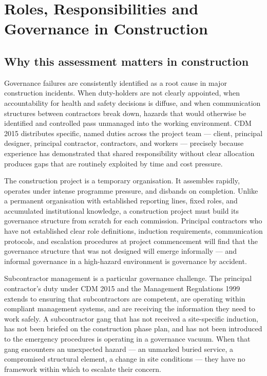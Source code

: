 \chapter{Roles, Responsibilities and Governance in Construction}
\label{chap:Roles, Responsibilities and Governance in Construction}

\section{Why this assessment matters in construction}

Governance failures are consistently identified as a root cause in major construction incidents. When duty-holders are not clearly appointed, when accountability for health and safety decisions is diffuse, and when communication structures between contractors break down, hazards that would otherwise be identified and controlled pass unmanaged into the working environment. CDM 2015 distributes specific, named duties across the project team --- client, principal designer, principal contractor, contractors, and workers --- precisely because experience has demonstrated that shared responsibility without clear allocation produces gaps that are routinely exploited by time and cost pressure.

The construction project is a temporary organisation. It assembles rapidly, operates under intense programme pressure, and disbands on completion. Unlike a permanent organisation with established reporting lines, fixed roles, and accumulated institutional knowledge, a construction project must build its governance structure from scratch for each commission. Principal contractors who have not established clear role definitions, induction requirements, communication protocols, and escalation procedures at project commencement will find that the governance structure that was not designed will emerge informally --- and informal governance in a high-hazard environment is governance by accident.

Subcontractor management is a particular governance challenge. The principal contractor's duty under CDM 2015 and the Management Regulations 1999 extends to ensuring that subcontractors are competent, are operating within compliant management systems, and are receiving the information they need to work safely. A subcontractor gang that has not received a site-specific induction, has not been briefed on the construction phase plan, and has not been introduced to the emergency procedures is operating in a governance vacuum. When that gang encounters an unexpected hazard --- an unmarked buried service, a compromised structural element, a change in site conditions --- they have no framework within which to escalate their concern.

